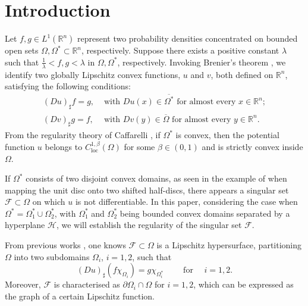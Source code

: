 \documentclass[11pt]{amsart}
\theoremstyle{plain}
\newcommand{\0}{\textbf{0}}
\numberwithin{equation}{section}
\numberwithin{equation}{section}
\numberwithin{figure}{section}
\begin{document}
\section{Introduction}
Let $f, g \in L^1(\mathbb{R}^n)$ represent two probability densities concentrated on bounded open sets $\Omega, \Omega^*\subset\mathbb{R}^n$, respectively. Suppose there exists a positive constant \(\lambda\) such that $\frac{1}{\lambda} < f, g < \lambda$ in $\Omega, \Omega^*$, respectively.
Invoking Brenier's theorem \cite{Br1}, we identify two globally Lipschitz convex functions, $u$ and $v$, both defined on $\mathbb{R}^n$, satisfying the following conditions:
\begin{align}
    (Du)_\sharp f = g, & \text{ with } Du(x) \in \overline{\Omega^*} \text{ for almost every } x \in \mathbb{R}^n; \label{condi1}\\
    (Dv)_\sharp g = f, & \text{ with } Dv(y) \in \overline{\Omega} \text{ for almost every } y \in \mathbb{R}^n. \label{condi2}
\end{align}
From the regularity theory of Caffarelli \cite{C92}, if $\Omega^*$ is convex, then the potential function $u$ belongs to $C^{1,\beta}_{\text{loc}}(\Omega)$ for some $\beta\in(0,1)$ and is strictly convex inside $\Omega$.

If $\Omega^*$ consists of two disjoint convex domains, as seen in the example of \cite{C92} when mapping the unit disc onto two shifted half-discs, there appears a singular set $\mathcal{F}\subset\Omega$ on which $u$ is not differentiable. 
In this paper, considering the case when $\Omega^* = \Omega^*_1 \cup \Omega^*_2$, with $\Omega^*_1$ and $\Omega^*_2$ being bounded convex domains separated by a hyperplane $\mathcal{H}$, we will establish the regularity of the singular set $\mathcal{F}$.

From previous works \cite{CL1, KM1}, one knows $\mathcal{F} \subset \Omega$ is a Lipschitz hypersurface, partitioning $\Omega$ into two subdomains $\Omega_i$, $i = 1, 2$, such that 
	\begin{equation}\label{condi3} 
		(Du)_{\sharp}(f\chi_{\Omega_i}) = g\chi_{\Omega^*_i}\qquad \text{ for }\quad i = 1, 2.
	\end{equation}
Moreover, $\mathcal{F}$ is characterised as $\partial\Omega_i \cap \Omega$ for $i = 1, 2$, which can be expressed as the graph of a certain Lipschitz function.
\end{document}
